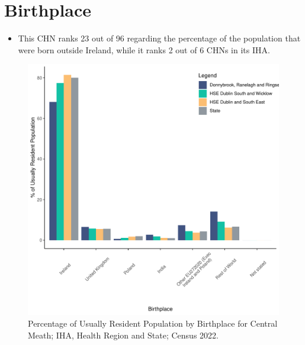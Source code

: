 \documentclass{article}
\begin{document}
\section{Birthplace}\label{sect:Birth}
\begin{itemize}
\item This CHN ranks  23 out of 96 regarding the percentage of the population that were born outside Ireland, while it ranks  2 out of 6 CHNs in its IHA.
\end{itemize}
\begin{figure}[H]
	\centering
	\includegraphics[width = 130mm]{../figures/BirthED.pdf}
	\caption{Percentage of Usually Resident Population by Birthplace for Central Meath; IHA, Health Region and State; Census 2022.}
	\label{fig:vbnv}
	\end{figure}
	
\end{document}
